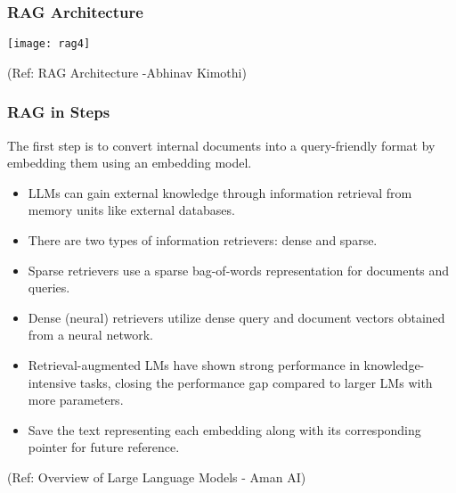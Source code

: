 \begin{frame}[fragile]\frametitle{RAG Architecture}


		\begin{center}
		\texttt{[image: rag4]}
		\end{center}

{\tiny (Ref: RAG Architecture -Abhinav  Kimothi)}

\end{frame}

\begin{frame}[fragile]\frametitle{RAG in Steps}

The first step is to convert internal documents into a query-friendly format by embedding them using an embedding model.

\begin{itemize}
\item LLMs can gain external knowledge through information retrieval from memory units like external databases.
\item There are two types of information retrievers: dense and sparse.
\item Sparse retrievers use a sparse bag-of-words representation for documents and queries.
\item Dense (neural) retrievers utilize dense query and document vectors obtained from a neural network.
\item Retrieval-augmented LMs have shown strong performance in knowledge-intensive tasks, closing the performance gap compared to larger LMs with more parameters.
\item Save the text representing each embedding along with its corresponding pointer for future reference.
\end{itemize}

{\tiny (Ref: Overview of Large Language Models - Aman AI)}

\end{frame}

